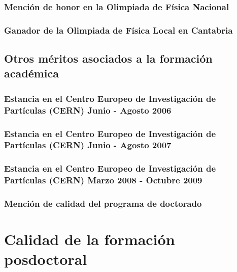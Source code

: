 \documentclass[a4paper, 11pt, twoside, openright]{report}
\begin{document}
\subsubsection{Mención de honor en la Olimpiada de Física Nacional}


\subsubsection{Ganador de la Olimpiada de Física Local en Cantabria}


\subsection{Otros méritos asociados a la formación académica}

\subsubsection{Estancia en el Centro Europeo de Investigación de Partículas (CERN) Junio - Agosto 2006}


\subsubsection{Estancia en el Centro Europeo de Investigación de Partículas (CERN) Junio - Agosto 2007}


\subsubsection{Estancia en el Centro Europeo de Investigación de Partículas (CERN) Marzo 2008 - Octubre 2009}


\subsubsection{Mención de calidad del programa de doctorado}


\section{Calidad de la formación posdoctoral}
\end{document}
